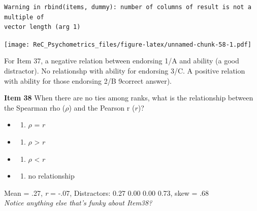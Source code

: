 \documentclass[
  english,
]{book}
\newenvironment{Shaded}{\begin{snugshade}}{\end{snugshade}}
\newcommand{\DataTypeTok}[1]{\textcolor[rgb]{0.13,0.29,0.53}{#1}}
\newcommand{\DecValTok}[1]{\textcolor[rgb]{0.00,0.00,0.81}{#1}}
\newcommand{\KeywordTok}[1]{\textcolor[rgb]{0.13,0.29,0.53}{\textbf{#1}}}
\newcommand{\NormalTok}[1]{#1}
\newcommand{\OperatorTok}[1]{\textcolor[rgb]{0.81,0.36,0.00}{\textbf{#1}}}
\providecommand{\tightlist}{%
  \setlength{\itemsep}{0pt}\setlength{\parskip}{0pt}}
\begin{document}
\begin{verbatim}
Warning in rbind(items, dummy): number of columns of result is not a multiple of
vector length (arg 1)
\end{verbatim}

\texttt{[image: ReC\_Psychometrics\_files/figure-latex/unnamed-chunk-58-1.pdf]}

For Item 37, a negative relation between endorsing 1/A and ability (a good distractor). No relationshp with ability for endorsing 3/C. A positive relation with ability for those endorsing 2/B 9correct answer).

\textbf{Item 38} When there are no ties among ranks, what is the relationship between the Spearman rho (\(\rho\)) and the Pearson r (\(r\))?

\begin{itemize}
\item
  \begin{enumerate}
  \def\labelenumi{\alph{enumi})}
  \tightlist
  \item
    \(\rho\) = \(r\)
  \end{enumerate}
\item
  \begin{enumerate}
  \def\labelenumi{\roman{enumi})}
  \setcounter{enumi}{1}
  \tightlist
  \item
    \(\rho\) \textgreater{} \(r\)
  \end{enumerate}
\item
  \begin{enumerate}
  \def\labelenumi{\alph{enumi})}
  \tightlist
  \item
    \(\rho\) \textless{} \(r\)
  \end{enumerate}
\item
  \begin{enumerate}
  \def\labelenumi{\alph{enumi})}
  \setcounter{enumi}{1}
  \tightlist
  \item
    no relationship
  \end{enumerate}
\end{itemize}

Mean = .27, \emph{r} = -.07, Distractors: 0.27 0.00 0.00 0.73, skew = .68\\
\emph{Notice anything else that's funky about Item38?}

\begin{Shaded}
\end{Shaded}
\end{document}
